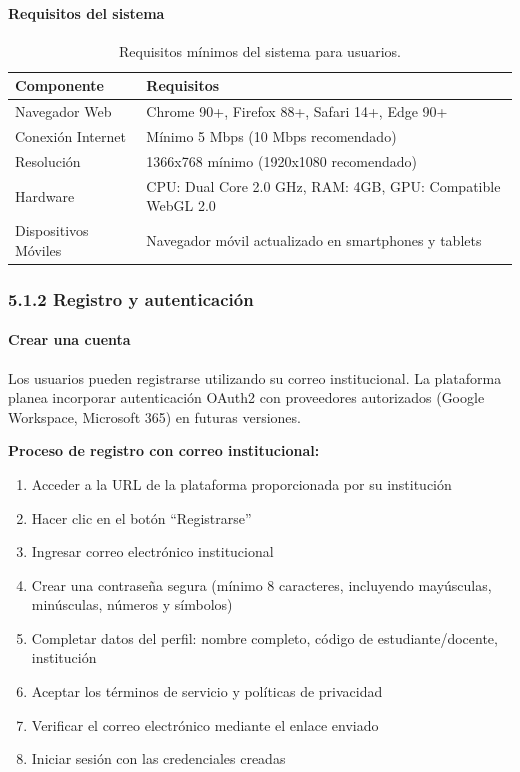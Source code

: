 \paragraph{Requisitos del sistema}

\begin{table}[H]
	\centering
	\caption{Requisitos mínimos del sistema para usuarios.}
	\begin{tabular}{p{4cm} p{9cm}}
		\toprule
		Componente & Requisitos \\
		\midrule
		Navegador Web & Chrome 90+, Firefox 88+, Safari 14+, Edge 90+ \\
		Conexión Internet & Mínimo 5 Mbps (10 Mbps recomendado) \\
		Resolución & 1366x768 mínimo (1920x1080 recomendado) \\
		Hardware & CPU: Dual Core 2.0 GHz, RAM: 4GB, GPU: Compatible WebGL 2.0 \\
		Dispositivos Móviles & Navegador móvil actualizado en smartphones y tablets \\
		\bottomrule
	\end{tabular}
\end{table}

\subsubsection{5.1.2 Registro y autenticación}

\paragraph{Crear una cuenta}

Los usuarios pueden registrarse utilizando su correo institucional. La plataforma planea incorporar autenticación OAuth2 con proveedores autorizados (Google Workspace, Microsoft 365) en futuras versiones.

\textbf{Proceso de registro con correo institucional:}

\begin{enumerate}
	\item Acceder a la URL de la plataforma proporcionada por su institución
	\item Hacer clic en el botón ``Registrarse''
	\item Ingresar correo electrónico institucional
	\item Crear una contraseña segura (mínimo 8 caracteres, incluyendo mayúsculas, minúsculas, números y símbolos)
	\item Completar datos del perfil: nombre completo, código de estudiante/docente, institución
	\item Aceptar los términos de servicio y políticas de privacidad
	\item Verificar el correo electrónico mediante el enlace enviado
	\item Iniciar sesión con las credenciales creadas
\end{enumerate}

